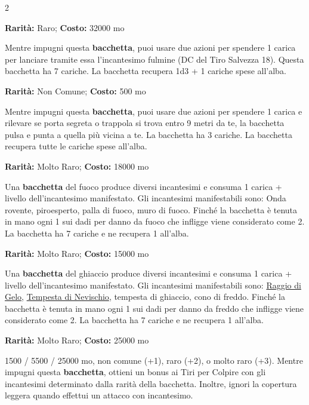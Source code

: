 \begin{multicols}{2}

\textbf{Rarità:} Raro; \textbf{Costo:} 32000 mo

Mentre impugni questa \textbf{bacchetta}, puoi usare due azioni per spendere 1 carica per lanciare tramite essa l'incantesimo fulmine (DC del Tiro Salvezza 18).
Questa bacchetta ha 7 cariche. La bacchetta recupera 1d3 + 1 cariche spese all'alba.


\textbf{Rarità:} Non Comune; \textbf{Costo:} 500 mo

Mentre impugni questa \textbf{bacchetta}, puoi usare due azioni per spendere 1 carica e rilevare se porta segreta o trappola si trova entro 9 metri da te, la bacchetta pulsa e punta a quella più vicina a te. La bacchetta ha 3 cariche. La bacchetta recupera tutte le cariche spese all'alba.


\textbf{Rarità:} Molto Raro; \textbf{Costo:} 18000 mo

Una \textbf{bacchetta} del fuoco produce diversi incantesimi e consuma 1 carica + livello dell'incantesimo manifestato. Gli incantesimi manifestabili sono: Onda rovente, piroesperto, palla di fuoco, muro di fuoco. Finché la bacchetta è tenuta in mano ogni 1 sui dadi per danno da fuoco che infligge viene considerato come 2. La bacchetta ha 7 cariche e ne recupera 1 all'alba.


\textbf{Rarità:} Molto Raro; \textbf{Costo:} 15000 mo

Una \textbf{bacchetta} del ghiaccio produce diversi incantesimi e consuma 1 carica + livello dell'incantesimo manifestato. Gli incantesimi manifestabili sono: \hyperlink{Raggio di Gelo}{Raggio di Gelo}, \hyperlink{Tempesta di Nevischio}{Tempesta di Nevischio}, tempesta di ghiaccio, cono di freddo. Finché la bacchetta è tenuta in mano ogni 1 sui dadi per danno da freddo che infligge viene considerato come 2. La bacchetta ha 7 cariche e ne recupera 1 all'alba.


\textbf{Rarità:} Molto Raro; \textbf{Costo:} 25000 mo

1500 / 5500 / 25000 mo, non comune (+1), raro (+2), o molto raro (+3). Mentre impugni questa \textbf{bacchetta}, ottieni un bonus ai Tiri per Colpire con gli incantesimi determinato dalla rarità della bacchetta. Inoltre, ignori la copertura leggera quando effettui un attacco con incantesimo.


\end{multicols}
